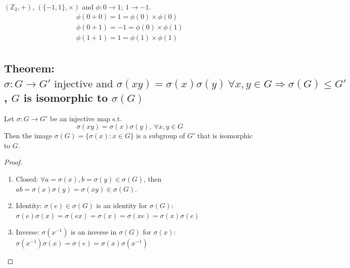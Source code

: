 \documentclass[11pt]{elegantbook}
\begin{document}
\begin{example}
    $(\mathbb{Z}_2,+)$, $(\{-1,1\},\times)$ and $\phi: 0 \rightarrow 1;\ 1 \rightarrow -1$.
    \begin{equation}
        \begin{aligned}
            \phi(0+0)=1=\phi(0)\times\phi(0)\\
            \phi(0+1)=-1=\phi(0)\times\phi(1)\\
            \phi(1+1)=1=\phi(1)\times\phi(1)\\
        \end{aligned}
        \nonumber
    \end{equation}
\end{example}


\subsection{Theorem:$\sigma: G \rightarrow G'\text{ injective}\text{ and }\sigma(xy)=\sigma(x)\sigma(y)\ \forall x,y\in G \Rightarrow	\sigma(G)\leq G'$, $G$ is isomorphic to $\sigma(G)$}
\begin{theorem}
Let $\sigma: G \rightarrow G'$ be an injective map s.t. $$\sigma (xy)=\sigma(x)\sigma(y),\ \forall x,y\in G$$
Then the image $\sigma(G)=\{\sigma(x):x\in G\}$ is a subgroup of $G'$ that is isomorphic to $G$.
\end{theorem}
\begin{proof}
\quad\\
\begin{enumerate}
    \item Closed: $\forall a=\sigma(x),b=\sigma(y)\in \sigma(G)$, then $ab=\sigma(x)\sigma(y)=\sigma(xy)\in \sigma(G)$.
    \item Identity: $\sigma(e)\in \sigma(G)$ is an identity for $\sigma(G)$: $\sigma(e)\sigma(x)=\sigma(ex)=\sigma(x)=\sigma(xe)=\sigma(x)\sigma(e)$
    \item Inverse: $\sigma(x^{-1})$ is an inverse in $\sigma(G)$ for $\sigma(x)$: $\sigma(x^{-1})\sigma(x)=\sigma(e)=\sigma(x)\sigma(x^{-1})$
\end{enumerate}
\end{proof}
\end{document}
